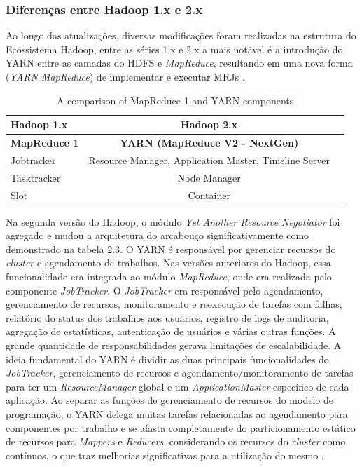 \subsubsection{Diferenças entre Hadoop 1.x e 2.x}

Ao longo das atualizações, diversas modificações foram realizadas na estrutura do Ecossistema Hadoop, entre as séries 1.x e 2.x a mais notável é a introdução do YARN entre as camadas do HDFS e \emph{MapReduce}, resultando em uma nova forma (\emph{YARN MapReduce}) de implementar e executar MRJs \cite{white2015hadoop}.

\begin{table}[htbp]
\centering
\caption{A comparison of MapReduce 1 and YARN components}
\label{MR1andYARN}
\begin{tabular}{|l|c|c|} \hline
\textbf{Hadoop 1.x} & \textbf{Hadoop 2.x} \\ \hline
\textbf{MapReduce 1} & \textbf{YARN (MapReduce V2 - NextGen)} \\ \hline
Jobtracker & Resource Manager, Application Master, Timeline Server \\
Tasktracker & Node Manager \\
Slot & Container \\ \hline
\end{tabular}
\end{table}

Na segunda versão do Hadoop, o módulo \emph{Yet Another Resource Negotiator} foi agregado e mudou a arquitetura do arcabouço significativamente como demonstrado na tabela 2.3. O YARN é responsável por gerenciar recursos do \emph{cluster} e agendamento de trabalhos. Nas versões anteriores do Hadoop, essa funcionalidade era integrada ao módulo \emph{MapReduce}, onde era realizada pelo componente \emph{JobTracker}. O \emph{JobTracker} era responsável pelo agendamento, gerenciamento de recursos, monitoramento e reexecução de tarefas com falhas, relatório do status dos trabalhos aos usuários, registro de logs de auditoria, agregação de estatísticas, autenticação de usuários e várias outras funções. A grande quantidade de responsabilidades gerava limitações de escalabilidade. A ideia fundamental do YARN é dividir as duas principais funcionalidades do \emph{JobTracker}, gerenciamento de recursos e agendamento/monitoramento de tarefas para ter um \emph{ResourceManager} global e um \emph{ApplicationMaster} específico de cada aplicação. Ao separar as funções de gerenciamento de recursos do modelo de programação, o YARN delega muitas tarefas relacionadas ao agendamento para componentes por trabalho e se afasta completamente do particionamento estático de recursos para \emph{Mappers} e \emph{Reducers}, considerando os recursos do \emph{cluster} como contínuos, o que traz melhorias significativas para a utilização do mesmo \cite{glushkova2019mapreduce}.


